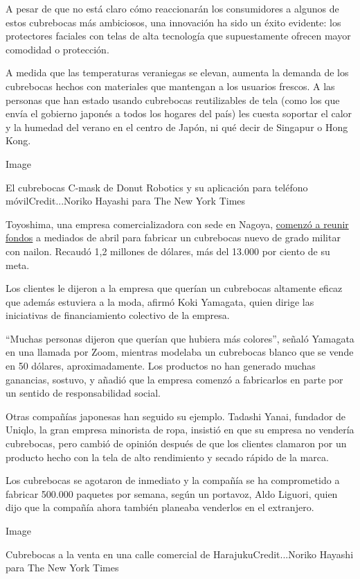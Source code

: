 A pesar de que no está claro cómo reaccionarán los consumidores a
algunos de estos cubrebocas más ambiciosos, una innovación ha sido un
éxito evidente: los protectores faciales con telas de alta tecnología
que supuestamente ofrecen mayor comodidad o protección.

A medida que las temperaturas veraniegas se elevan, aumenta la demanda
de los cubrebocas hechos con materiales que mantengan a los usuarios
frescos. A las personas que han estado usando cubrebocas reutilizables
de tela (como los que envía el gobierno japonés a todos los hogares del
país) les cuesta soportar el calor y la humedad del verano en el centro
de Japón, ni qué decir de Singapur o Hong Kong.

Image

El cubrebocas C-mask de Donut Robotics y su aplicación para teléfono
móvilCredit...Noriko Hayashi para The New York Times

Toyoshima, una empresa comercializadora con sede en Nagoya,
\href{https://www.makuake.com/project/toyoshima-mask/}{comenzó a reunir
fondos} a mediados de abril para fabricar un cubrebocas nuevo de grado
militar con nailon. Recaudó 1,2 millones de dólares, más del 13.000 por
ciento de su meta.

Los clientes le dijeron a la empresa que querían un cubrebocas altamente
eficaz que además estuviera a la moda, afirmó Koki Yamagata, quien
dirige las iniciativas de financiamiento colectivo de la empresa.

``Muchas personas dijeron que querían que hubiera más colores'', señaló
Yamagata en una llamada por Zoom, mientras modelaba un cubrebocas blanco
que se vende en 50 dólares, aproximadamente. Los productos no han
generado muchas ganancias, sostuvo, y añadió que la empresa comenzó a
fabricarlos en parte por un sentido de responsabilidad social.

Otras compañías japonesas han seguido su ejemplo. Tadashi Yanai,
fundador de Uniqlo, la gran empresa minorista de ropa, insistió en que
su empresa no vendería cubrebocas, pero cambió de opinión después de que
los clientes clamaron por un producto hecho con la tela de alto
rendimiento y secado rápido de la marca.

Los cubrebocas se agotaron de inmediato y la compañía se ha comprometido
a fabricar 500.000 paquetes por semana, según un portavoz, Aldo Liguori,
quien dijo que la compañía ahora también planeaba venderlos en el
extranjero.

Image

Cubrebocas a la venta en una calle comercial de HarajukuCredit...Noriko
Hayashi para The New York Times

